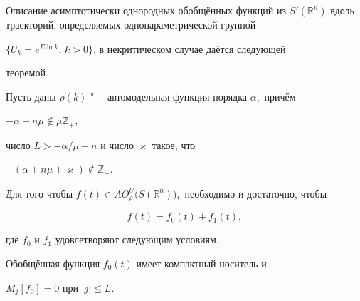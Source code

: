 \smallskip



Описание асимптотически однородных обобщённых функций из $S'(\mathbb R^n)$ вдоль траекторий, определяемых однопараметрической группой

$\{U_k=e^{E\ln k}$, $k>0\}$, в некритическом случае даётся следующей

теоремой.



\smallskip



\begin{theorem}[1]

Пусть даны $\rho(k)$ "--- автомодельная функция порядка $\alpha, $ причём



$-\alpha-n\mu \notin  \mu \mathbb Z_{+},$


число $L>{-\alpha}/{\mu}-n$  и число $\varkappa$ такое{\rm,} что



$-(\alpha+n\mu+\varkappa) \notin \mathbb Z_{+}.$


Для того чтобы $f(t)\in AO_{\rho}^{U}\bigl(S(\mathbb R^n)\bigr),$ необходимо и достаточно{\rm,} чтобы 

\begin{equation*}


f(t)=f_0(t)+f_1(t),

\end{equation*}

где $f_0$ и $f_1$ удовлетворяют следующим условиям.



Обобщённая функция $f_0(t)$ имеет компактный носитель и



$M_{j}[f_0]= 0$ при $ |j|\leq L.$





\end{theorem}
